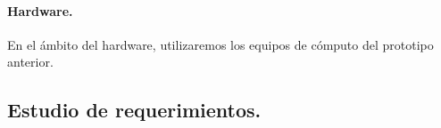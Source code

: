 \documentclass[12pt, a4paper, titlepage]{report}
\begin{document}
				\paragraph{Hardware. \\}
				En el ámbito del hardware, utilizaremos los equipos de cómputo del prototipo anterior.
			
			
			
		    \subsection{Estudio de requerimientos.}
\end{document}
